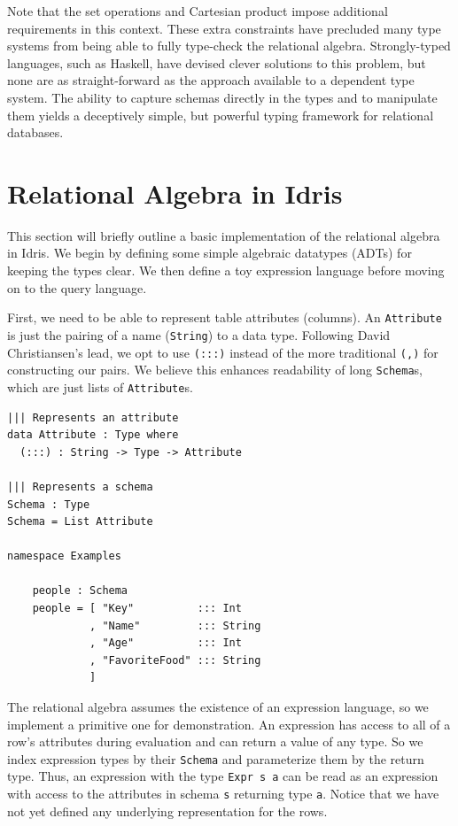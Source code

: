 \documentclass[12pt]{report}
\begin{document}
Note that the set operations and Cartesian product impose additional requirements in this context.
These extra constraints have precluded many type systems from being able to fully type-check the relational algebra.
Strongly-typed languages, such as Haskell, have devised clever solutions to this problem, but none are as straight-forward as the approach available to a dependent type system.
The ability to capture schemas directly in the types and to manipulate them yields a deceptively simple, but powerful typing framework for relational databases.

\section{Relational Algebra in Idris}

This section will briefly outline a basic implementation of the relational algebra in Idris.
We begin by defining some simple algebraic datatypes (ADTs) for keeping the types clear.
We then define a toy expression language before moving on to the query language.

First, we need to be able to represent table attributes (columns).
An \texttt{Attribute} is just the pairing of a name (\texttt{String}) to a data type.
Following David Christiansen's lead, we opt to use \texttt{(:::)} instead of the more traditional \texttt{(,)} for constructing our pairs\cite{ChristiansenTypeProviders}.
We believe this enhances readability of long \texttt{Schema}s, which are just lists of \texttt{Attribute}s.

\begin{lstlisting}[caption={Representing attributes and schemas},label={lst:attrs_and_schemas}]
||| Represents an attribute
data Attribute : Type where
  (:::) : String -> Type -> Attribute

||| Represents a schema
Schema : Type
Schema = List Attribute

namespace Examples

    people : Schema
    people = [ "Key"          ::: Int
             , "Name"         ::: String
             , "Age"          ::: Int
             , "FavoriteFood" ::: String
             ]
\end{lstlisting}

The relational algebra assumes the existence of an expression language, so we implement a primitive one for demonstration.
An expression has access to all of a row's attributes during evaluation and can return a value of any type.
So we index expression types by their \texttt{Schema} and parameterize them by the return type.
Thus, an expression with the type \texttt{Expr s a} can be read as an expression with access to the attributes in schema \texttt{s} returning type \texttt{a}.
Notice that we have not yet defined any underlying representation for the rows.
\end{document}
